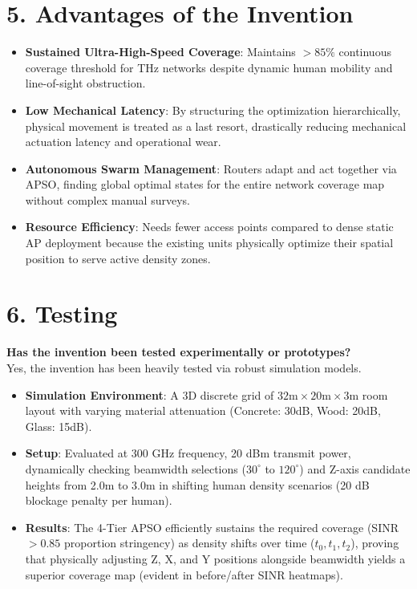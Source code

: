 \documentclass[11pt, a4paper]{article}
\begin{document}
\section*{5. Advantages of the Invention}
\begin{itemize}
    \item \textbf{Sustained Ultra-High-Speed Coverage}: Maintains $>85\%$ continuous coverage threshold for THz networks despite dynamic human mobility and line-of-sight obstruction.
    \item \textbf{Low Mechanical Latency}: By structuring the optimization hierarchically, physical movement is treated as a last resort, drastically reducing mechanical actuation latency and operational wear.
    \item \textbf{Autonomous Swarm Management}: Routers adapt and act together via APSO, finding global optimal states for the entire network coverage map without complex manual surveys.
    \item \textbf{Resource Efficiency}: Needs fewer access points compared to dense static AP deployment because the existing units physically optimize their spatial position to serve active density zones.
\end{itemize}

\section*{6. Testing}
\textbf{Has the invention been tested experimentally or prototypes?} \\
Yes, the invention has been heavily tested via robust simulation models.
\begin{itemize}
    \item \textbf{Simulation Environment}: A 3D discrete grid of $32\text{m} \times 20\text{m} \times 3\text{m}$ room layout with varying material attenuation (Concrete: 30dB, Wood: 20dB, Glass: 15dB). 
    \item \textbf{Setup}: Evaluated at 300 GHz frequency, 20 dBm transmit power, dynamically checking beamwidth selections ($30^\circ$ to $120^\circ$) and Z-axis candidate heights from 2.0m to 3.0m in shifting human density scenarios (20 dB blockage penalty per human).
    \item \textbf{Results}: The 4-Tier APSO efficiently sustains the required coverage (SINR $> 0.85$ proportion stringency) as density shifts over time ($t_0, t_1, t_2$), proving that physically adjusting Z, X, and Y positions alongside beamwidth yields a superior coverage map (evident in before/after SINR heatmaps).
\end{itemize}
\end{document}
